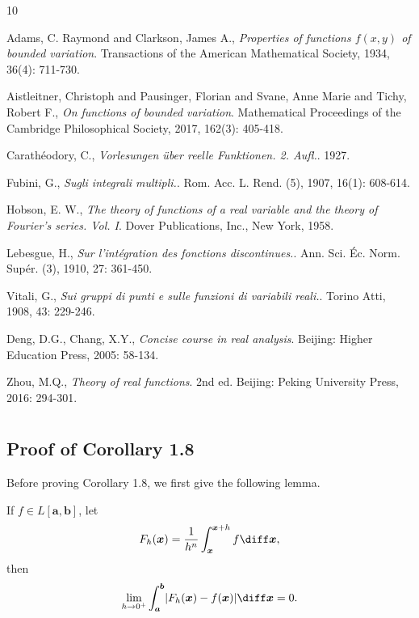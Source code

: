 \documentclass{ijclclp}
\begin{document}
\begin{thebibliography}{10}

 Adams, C. Raymond and Clarkson, James A., \textit{Properties of functions {$f(x,y)$} of bounded variation}. Transactions of the American Mathematical Society, 1934, 36(4): 711-730.

 Aistleitner, Christoph and Pausinger, Florian and Svane, Anne Marie and Tichy, Robert F., \textit{On functions of bounded variation}. Mathematical Proceedings of the Cambridge Philosophical Society, 2017, 162(3): 405-418.

 Carath{\'e}odory, C., \textit{Vorlesungen {\"u}ber reelle {Funktionen}. 2. {Aufl}.}. 1927.

 Fubini, G., \textit{Sugli integrali multipli.}. Rom. Acc. L. Rend. (5), 1907, 16(1): 608-614.

 Hobson, E. W., \textit{The theory of functions of a real variable and the theory of {F}ourier's series. {V}ol. {I}}. Dover Publications, Inc., New York, 1958.

 Lebesgue, H., \textit{Sur l'int{\'e}gration des fonctions discontinues.}. Ann. Sci. {\'E}c. Norm. Sup{\'e}r. (3), 1910, 27: 361-450.

 Vitali, G., \textit{Sui gruppi di punti e sulle funzioni di variabili reali.}. Torino Atti, 1908, 43: 229-246.

 Deng, D.G., Chang, X.Y., \textit{Concise course in real analysis}. Beijing: Higher Education Press, 2005: 58-134.

 Zhou, M.Q., \textit{Theory of real functions}. 2nd ed. Beijing: Peking University Press, 2016: 294-301.

\end{thebibliography} 

\appendix
\section{}
\subsection{Proof of Corollary 1.8}
Before proving Corollary 1.8, we first give the following lemma.
\begin{lemma}
    If \(f\in L[\boldsymbol{a},\boldsymbol{b}]\), let
    \[F_h(\boldsymbol{x})=\frac{1}{h^n}\int_{\boldsymbol{x}}^{\boldsymbol{x}+h}f\diff \boldsymbol{x},\]
    then
    \[
        \lim_{h\to0^+}\int_{\boldsymbol{a}}^{\boldsymbol{b}}\lvert F_h(\boldsymbol{x})-f(\boldsymbol{x})\rvert\diff \boldsymbol{x}=0.
    \]
\end{lemma}
\end{document}
